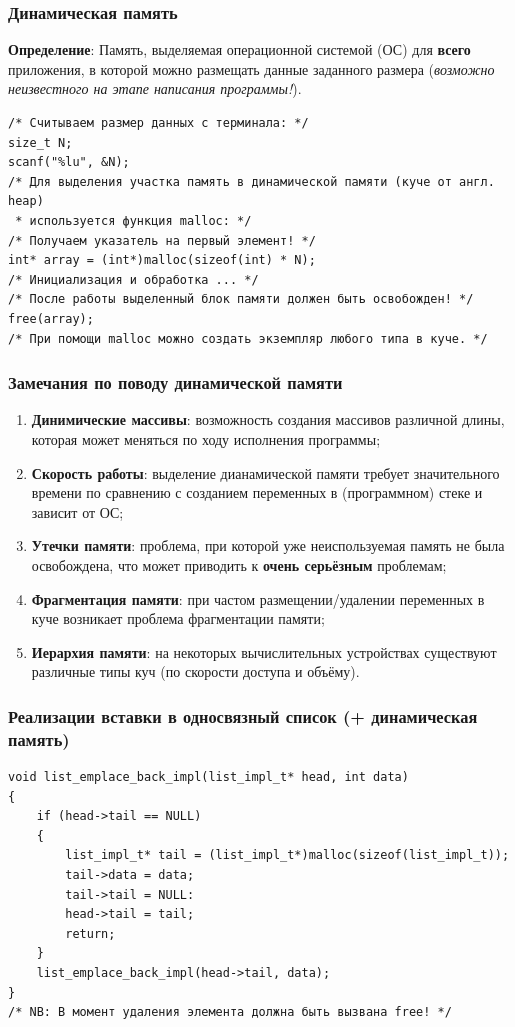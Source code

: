 \documentclass{beamer}
\begin{document}
    \begin{frame}[fragile]
        \frametitle{Динамическая память}
        \justifying
        {\bf Определение}: Память, выделяемая операционной системой (ОС) для {\bf всего} приложения, в которой можно размещать данные заданного размера ({\it возможно неизвестного на этапе написания программы!}).
        \begin{verbatim}
/* Считываем размер данных с терминала: */
size_t N;
scanf("%lu", &N);
/* Для выделения участка память в динамической памяти (куче от англ. heap)
 * используется функция malloc: */
/* Получаем указатель на первый элемент! */
int* array = (int*)malloc(sizeof(int) * N); 
/* Инициализация и обработка ... */
/* После работы выделенный блок памяти должен быть освобожден! */
free(array);
/* При помощи malloc можно создать экземпляр любого типа в куче. */
        \end{verbatim}
    \end{frame}
    \begin{frame}[fragile]
        \frametitle{Замечания по поводу динамической памяти}
        \begin{enumerate}
            \justifying
            \item {\bf Динимические массивы}: возможность создания массивов различной длины, которая может меняться по ходу исполнения программы;
            \item {\bf Скорость работы}: выделение дианамической памяти требует значительного времени по сравнению с созданием переменных в (программном) стеке и зависит от ОС;
            \item {\bf Утечки памяти}: проблема, при которой уже неиспользуемая память не была освобождена, что может приводить к {\bf очень серьёзным} проблемам;
            \item {\bf Фрагментация памяти}: при частом размещении/удалении переменных в куче возникает проблема фрагментации памяти;
            \item {\bf Иерархия памяти}: на некоторых вычислительных устройствах существуют различные типы куч (по скорости доступа и объёму).
        \end{enumerate}
    \end{frame}
    \begin{frame}[fragile]
        \frametitle{Реализации вставки в односвязный список (+ динамическая память)}
        \begin{verbatim}
void list_emplace_back_impl(list_impl_t* head, int data)
{
    if (head->tail == NULL)
    {
        list_impl_t* tail = (list_impl_t*)malloc(sizeof(list_impl_t));
        tail->data = data;
        tail->tail = NULL:
        head->tail = tail;
        return;
    }
    list_emplace_back_impl(head->tail, data);
}
/* NB: В момент удаления элемента должна быть вызвана free! */
        \end{verbatim}
    \end{frame}
\end{document}
